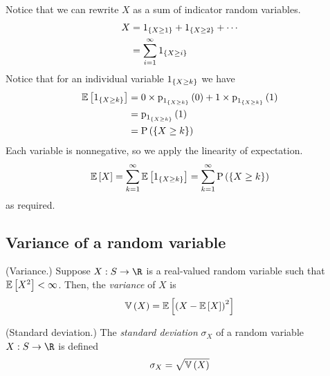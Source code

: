 \documentclass[11pt]{article}
\begin{document}
\begin{solution}
    \newcommand{\Xgeq}[1]{\ensuremath \setof{X \geq #1}}
    \newcommand{\indicator}[1]{\ensuremath 1_{\Xgeq{#1}}}
    Notice that we can rewrite $X$ as a sum of indicator random variables.
    \begin{align*}
        X
        &= \indicator{1} + \indicator{2} + \cdots \\
        &= \sum_{i=1}^\infty { \indicator{i} }
    \end{align*}
    Notice that for an individual variable $\indicator{k}$ we have
    \begin{align*}
        \E{\indicator{k}}
        &= 0 \times \p[\indicator{k}]{0}
            + 1 \times \p[\indicator{k}]{1} \\
        &= \p[\indicator{k}]{1} \\
        &= \P{\Xgeq{k}}
    \end{align*}
    Each variable is nonnegative, so we apply the linearity of expectation.
    \begin{equation*}
        \E{X}
        = \sum_{k=1}^\infty {
            \E{\indicator{k}}
        }
        = \sum_{k=1}^\infty {
            \P{\Xgeq{k}}
        }
    \end{equation*}
    as required.
\end{solution}

\subsection{Variance of a random variable}

\begin{defn}{(Variance.)}
    \label{def:variance}
    Suppose $X : S \to \R$ is a real-valued random variable such that
    $\operatorname{\mathbb{E}}{\left[X^2\right]} < \infty$.
    Then, the \emph{variance} of $X$ is
    \begin{equation}
        \label{eq:variance}
        \operatorname{\mathbb{V}}{\left(X\right)} = \operatorname{\mathbb{E}}{\left[\left(X - \operatorname{\mathbb{E}}{\left[X\right]}\right)^2\right]}
    \end{equation}
\end{defn}

\begin{defn}{(Standard deviation.)}
    \label{def:stdev}
    The \emph{standard deviation} $\sigma_X$ of a random variable
    $X : S \to \R$ is defined
    \begin{equation}
        \label{eq:stdev}
        \sigma_X = \sqrt{\operatorname{\mathbb{V}}{\left(X\right)}}
    \end{equation}
\end{defn}
\end{document}
